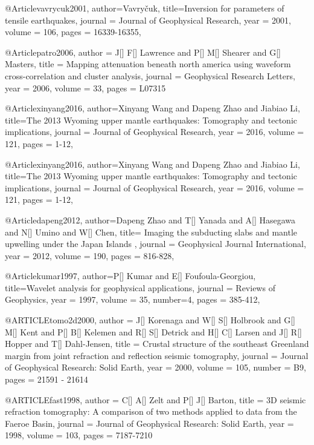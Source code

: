 @Article{vavrycuk2001,
  author={Vavry\v{c}uk},
  title={Inversion for parameters of tensile earthquakes},
  journal = 	 {Journal of Geophysical Research},
  year = 	 2001,
  volume =	 106,
  pages =	 {16339-16355},
}

@Article{patro2006,
  author = 	 {J[] F[] Lawrence and P[] M[] Shearer and G[] Masters},
  title = 	 {Mapping attenuation beneath north america using waveform cross-correlation and cluster analysis},
  journal = 	 {Geophysical Research Letters},
  year = 	 2006,
  volume = 33,
  pages =	 {L07315}
}

@Article{xinyang2016,
  author={Xinyang Wang and Dapeng Zhao and Jiabiao Li},
  title={The 2013 Wyoming upper mantle earthquakes: Tomography and tectonic implications},
  journal = 	 {Journal of Geophysical Research},
  year = 	 2016,
  volume =	 121,
  pages =	 {1-12},
}


@Article{xinyang2016,
  author={Xinyang Wang and Dapeng Zhao and Jiabiao Li},
  title={The 2013 Wyoming upper mantle earthquakes: Tomography and tectonic implications},
  journal = 	 {Journal of Geophysical Research},
  year = 	 2016,
  volume =	 121,
  pages =	 {1-12},
}

@Article{dapeng2012,
  author={Dapeng Zhao and T[] Yanada and A[] Hasegawa and N[] Umino and W[] Chen},
  title={ Imaging the subducting slabs and mantle upwelling under the Japan Islands },
  journal = 	 {Geophysical Journal International},
  year = 	 2012,
  volume =	 190,
  pages =	 {816-828},
}


@Article{kumar1997,
  author={P[] Kumar and E[] Foufoula-Georgiou},
  title={Wavelet analysis for geophysical applications},
  journal = 	 {Reviews of Geophysics},
  year = 	 1997,
  volume =	 35,
  number=4,
  pages =	 {385-412},
}

@ARTICLE{tomo2d2000,
  author = {J[] Korenaga and W[] S[] Holbrook and G[] M[] Kent and P[] B[] Kelemen and R[] S[] Detrick and H[] C[] Larsen and J[] R[] Hopper and T[] Dahl-Jensen},
  title = {Crustal structure of the southeast Greenland margin from joint refraction and reflection seismic tomography},
  journal = {Journal of Geophysical Research: Solid Earth},
  year = {2000},
  volume = {105},
  number = B9,
  pages = {21591 - 21614}
}

@ARTICLE{fast1998,
  author = {C[] A[] Zelt and P[] J[] Barton},
  title = {3D seismic refraction tomography: A comparison of two methods applied to data from the Faeroe Basin},
  journal = {Journal of Geophysical Research: Solid Earth},
  year = {1998},
  volume = {103},
  pages = {7187-7210}
}


